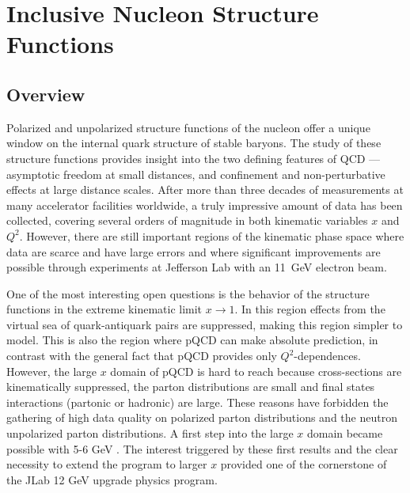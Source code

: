 \section{Inclusive Nucleon Structure Functions}

\subsection{Overview}

Polarized and unpolarized structure functions of the nucleon offer a
unique window on the internal quark structure of stable baryons.
The study of these structure functions provides insight into the two
defining features of QCD --- asymptotic freedom at small distances,
and confinement and non-perturbative effects at large distance scales.
After more than three decades of measurements at many accelerator
facilities worldwide, a truly impressive amount of data has been
collected, covering several orders of magnitude in both kinematic
variables $x$ and $Q^2$.
However, there are still important regions of the kinematic phase space
where data are scarce and have large errors and where significant
improvements are possible through experiments at Jefferson Lab with an
11~GeV electron beam.

One of the most interesting open questions is the behavior of the
structure functions in the extreme kinematic limit $x \rightarrow 1$.
In this region effects from the virtual sea of quark-antiquark pairs are 
suppressed, making this region simpler to model. This is also the region
where pQCD can make absolute prediction, in contrast with the general fact 
that pQCD provides only $Q^2$-dependences. However, the large $x$ domain of
pQCD is hard to reach because cross-sections are kinematically suppressed, 
the parton distributions are small and final states interactions (partonic or 
hadronic) are large. These reasons have forbidden the gathering of high data 
quality on polarized parton distributions and the neutron unpolarized parton 
distributions. A first step into the large $x$ domain became possible with 
5-6 GeV \cite{Zheng:2004ce,Dharmawardane:2006zd, BONUS}. The interest triggered by these
first results and the clear necessity to extend the program to larger $x$ 
provided one of the cornerstone of the JLab 12 GeV upgrade physics program.  


